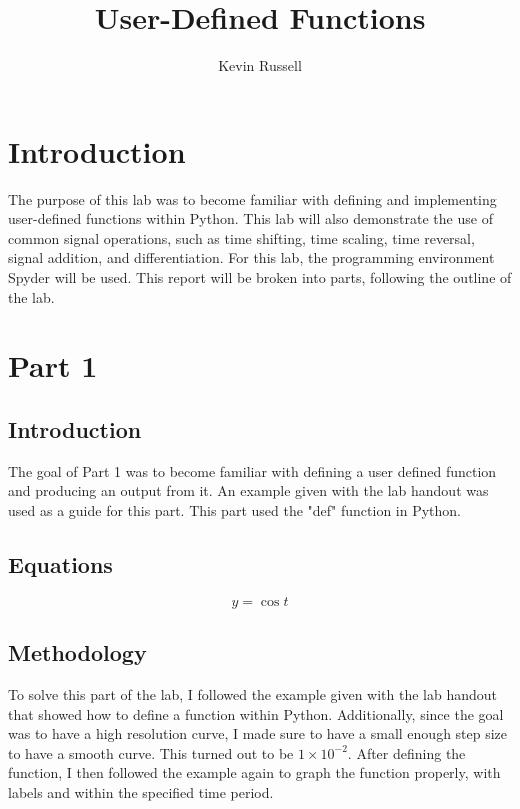 \documentclass[12pt, titlepage]{article}
\author{Kevin Russell}
\title{User-Defined Functions}
\date{\parbox{\linewidth}{\centering%
  \experimentDate
  \endgraf\bigskip
  \className\ -- Section \sectionNumber\
}}
\begin{document}
 \newpage
	    \maketitle
    
    \newpage
        \tableofcontents
    
    \newpage
        \section{Introduction}
            The purpose of this lab was to become familiar with defining and implementing user-defined functions within Python.  This lab will also demonstrate the use of common signal operations, such as time shifting, time scaling, time reversal, signal addition, and differentiation.  For this lab, the programming environment Spyder will be used.  This report will be broken into parts, following the outline of the lab.
            
        \section{Part 1}
            \subsection{Introduction}
            The goal of Part 1 was to become familiar with defining a user defined function and producing an output from it.  An example given with the lab handout was used as a guide for this part.  This part used the "def" function in Python.
            
            \subsection{Equations}
            \begin{equation}
                y=\cos{t}
            \end{equation}
            
            \subsection{Methodology}
            To solve this part of the lab, I followed the example given with the lab handout that showed how to define a function within Python.  Additionally, since the goal was to have a high resolution curve, I made sure to have a small enough step size to have a smooth curve.  This turned out to be $1\times10^{-2}$.  After defining the function, I then followed the example again to graph the function properly, with labels and within the specified time period.
            
\end{document}
